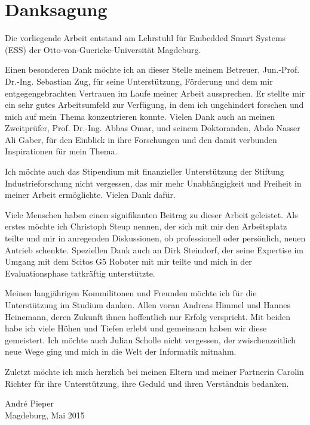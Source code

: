 \chapter*{Danksagung}
Die vorliegende Arbeit entstand am Lehrstuhl für Embedded Smart Systems (ESS) der Otto-von-Guericke-Universität Magdeburg. \par\smallskip
Einen besonderen Dank möchte ich an dieser Stelle meinem Betreuer, Jun.-Prof. Dr.-Ing. Sebastian Zug, für seine Unterstützung, Förderung und dem mir entgegengebrachten Vertrauen im Laufe meiner Arbeit aussprechen. Er stellte mir ein sehr gutes Arbeitsumfeld zur Verfügung, in dem ich ungehindert forschen und mich auf mein Thema konzentrieren konnte. Vielen Dank auch an meinen Zweitprüfer, Prof. Dr.-Ing. Abbas Omar, und seinem Doktoranden, Abdo Nasser Ali Gaber, für den Einblick in ihre Forschungen und den damit verbunden Inspirationen für mein Thema. \par\smallskip
Ich möchte auch das Stipendium mit finanzieller Unterstützung der Stiftung Industrieforschung nicht vergessen, das mir mehr Unabhängigkeit und Freiheit in meiner Arbeit ermöglichte. Vielen Dank dafür. \par\smallskip
Viele Menschen haben einen signifikanten Beitrag zu dieser Arbeit geleistet. Als erstes möchte ich Christoph Steup nennen, der sich mit mir den Arbeitsplatz teilte und mir in anregenden Diskussionen, ob professionell oder persönlich, neuen Antrieb schenkte. Speziellen Dank auch an Dirk Steindorf, der seine Expertise im Umgang mit dem Scitos G5 Roboter mit mir teilte und mich in der Evaluationsphase tatkräftig unterstützte. \par\smallskip
Meinen langjährigen Kommilitonen und Freunden möchte ich für die Unterstützung im Studium danken. Allen voran Andreas Himmel und Hannes Heinemann, deren Zukunft ihnen hoffentlich nur Erfolg verspricht. Mit beiden habe ich viele Höhen und Tiefen erlebt und gemeinsam haben wir diese gemeistert. Ich möchte auch Julian Scholle nicht vergessen, der zwischenzeitlich neue Wege ging und mich in die Welt der Informatik mitnahm. \par\smallskip
Zuletzt möchte ich mich herzlich bei meinen Eltern und meiner Partnerin Carolin Richter für ihre Unterstützung, ihre Geduld und ihren Verständnis bedanken.\par\medskip
\begin{flushright}
André Pieper\\
Magdeburg, Mai 2015
\end{flushright}  